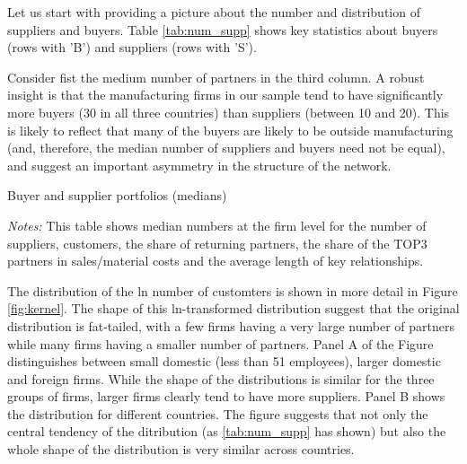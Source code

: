 \documentclass[final, dvipsnames, authoryear,12pt]{elsarticle}
\begin{document}
Let us start with providing a picture about the number and distribution of suppliers and buyers. Table \ref{tab:num_supp} shows key statistics about buyers (rows with 'B') and suppliers (rows with 'S'). 

Consider fist the medium number of partners in the third column. A robust insight is that the manufacturing firms in our sample tend to have significantly more buyers (30 in all three countries) than suppliers (between 10 and 20). This is likely to reflect that many of the buyers are likely to be outside manufacturing (and, therefore, the median number of suppliers and buyers need not be equal), and suggest an important asymmetry in the structure of the network. 

\begin{table}[H]
    \caption{Buyer and supplier portfolios (medians)}
    \label{tab:num_supp}
    \centerline{
    }
    {\scriptsize \textit{Notes:} This table shows median numbers at the firm level for the number of suppliers, customers, the share of returning partners, the share of the TOP3 partners in sales/material costs and the average length of key relationships.}
\end{table}


The distribution of the ln number of customters is shown in more detail in Figure \ref{fig:kernel}. The shape of this ln-transformed distribution suggest that the original distribution is fat-tailed, with a few firms having a very large number of partners while many firms having a smaller number of partners. Panel A of the Figure distinguishes between small domestic (less than 51 employees), larger domestic and foreign firms. While the shape of the distributions is similar for the three groups of firms, larger firms clearly tend to have more suppliers. Panel B shows the distribution for different countries. The figure suggests that not only the central tendency of the ditribution (as \ref{tab:num_supp} has shown) but also the whole shape of the distribution is very similar across countries.
\end{document}
